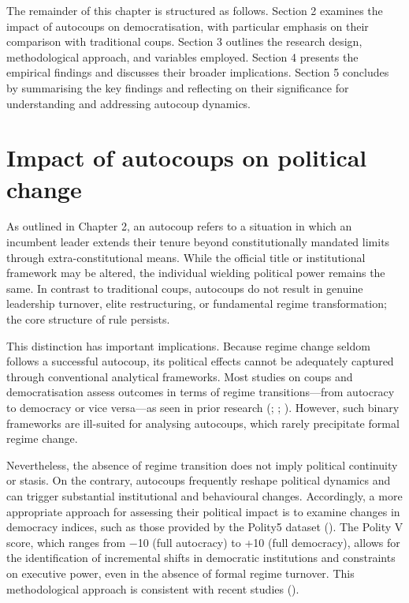 \documentclass[
  12pt,
]{report}
\begin{document}
The remainder of this chapter is structured as follows. Section 2
examines the impact of autocoups on democratisation, with particular
emphasis on their comparison with traditional coups. Section 3 outlines
the research design, methodological approach, and variables employed.
Section 4 presents the empirical findings and discusses their broader
implications. Section 5 concludes by summarising the key findings and
reflecting on their significance for understanding and addressing
autocoup dynamics.

\section{Impact of autocoups on political
change}\label{impact-of-autocoups-on-political-change}

As outlined in Chapter 2, an autocoup refers to a situation in which an
incumbent leader extends their tenure beyond constitutionally mandated
limits through extra-constitutional means. While the official title or
institutional framework may be altered, the individual wielding
political power remains the same. In contrast to traditional coups,
autocoups do not result in genuine leadership turnover, elite
restructuring, or fundamental regime transformation; the core structure
of rule persists.

This distinction has important implications. Because regime change
seldom follows a successful autocoup, its political effects cannot be
adequately captured through conventional analytical frameworks. Most
studies on coups and democratisation assess outcomes in terms of regime
transitions---from autocracy to democracy or vice versa---as seen in
prior research (;
;
). However, such binary
frameworks are ill-suited for analysing autocoups, which rarely
precipitate formal regime change.

Nevertheless, the absence of regime transition does not imply political
continuity or stasis. On the contrary, autocoups frequently reshape
political dynamics and can trigger substantial institutional and
behavioural changes. Accordingly, a more appropriate approach for
assessing their political impact is to examine changes in democracy
indices, such as those provided by the Polity5 dataset
(). The Polity V
score, which ranges from −10 (full autocracy) to +10 (full democracy),
allows for the identification of incremental shifts in democratic
institutions and constraints on executive power, even in the absence of
formal regime turnover. This methodological approach is consistent with
recent studies ().
\end{document}
